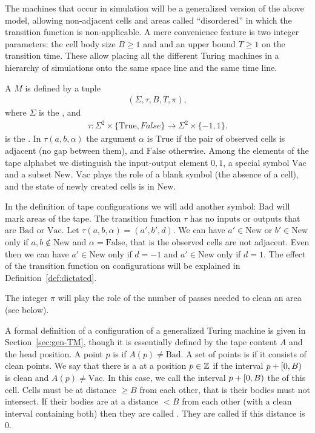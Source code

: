 \documentclass[11pt]{memoir}
\theoremstyle{definition} %
\renewcommand{\ge}{\geq}
\def\B{B}
\newcommand{\passno}{\pi}
\newcommand{\Tu}{T}
\newcommand{\Bad}{\mathrm{Bad}}
\newcommand{\Vacant}{\mathrm{Vac}}
\newcommand{\New}{\mathrm{New}}
\newcommand{\True}{\mathrm{True}}
\newcommand{\False}{\mathrm{False}}
\begin{document}
The machines that occur in simulation will be a generalized version of the above model,
allowing non-adjacent cells and areas called ``disordered''
in which the transition function is non-applicable.
A mere convenience feature is two integer parameters:
the cell body size \( \B\ge 1 \) and and an upper bound \( \Tu\ge 1 \) on the transition time.
These allow placing all the different Turing
machines in a hierarchy of simulations onto the same space line and the same time line.

\begin{definition}\label{def:gen-TM}
  A  \( M \) is defined by a tuple
  \begin{align}\label{eq:gen-TM}
    (\Sigma, \tau, \B, \Tu, \passno),
  \end{align}
  where \( \Sigma \) is the , and
\begin{align*}
  \tau: \Sigma^{2}\times\{\True,False\}\to \Sigma^{2}\times\{-1,1\}  .
\end{align*}
is the .
In  \( \tau(a,b,\alpha) \) the argument \( \alpha \) is \( \True \) if the pair of observed cells is
adjacent (no gap between them), and \( \False \) otherwise.
Among the elements of the tape alphabet we distinguish the input-output element \( 0,1 \),
a special symbol \( \Vacant \) and a subset \( \New \).
\( \Vacant \) plays the role of a blank symbol (the absence of a cell),
and the state of newly created cells is in \( \New \).

In the definition of tape configurations we will add another symbol: \( \Bad \) will
mark  areas of the tape.
The transition function \( \tau \) has no inputs or outputs that are \( \Bad \) or \( \Vacant \).
Let \( \tau(a,b,\alpha) = (a',b',d) \).
We can have \( a'\in\New \) or \( b'\in\New \) only if \( a,b\not\in\New \) and \( \alpha=\False \),
that is the observed cells are not adjacent.
Even then we can have \( a'\in\New \) only if \( d=-1 \) and \( a'\in\New \) only if \( d=1 \). 
The effect of the transition function on configurations will be explained in
Definition~\ref{def:dictated}.

The integer \( \passno \) will play the role of the number of passes needed to clean an area (see below).
\end{definition}

A formal definition of a configuration of a generalized Turing machine is given in
Section~\ref{sec:gen-TM}, though it is essentially defined by the tape content \( A \) and the head
position.
A point \( p \) is  if  \( A(p)\ne\Bad \).
A set of points is  if it consists of clean points.
We say that there is a  at a position \( p\in\mathbb{Z} \) if the interval
\( p+\lint{0}{\B} \) is clean and \( A(p)\ne \Vacant \).
In this case, we call the interval \( p+\lint{0}{\B} \) the  of this cell.
Cells must be at distance \( \ge\B \) from each other, that is their
bodies must not intersect.
If their bodies are at a distance \( <\B \) from each
other (with a clean interval containing both) then they are called .
They are called  if this distance is \( 0 \).
\end{document}
